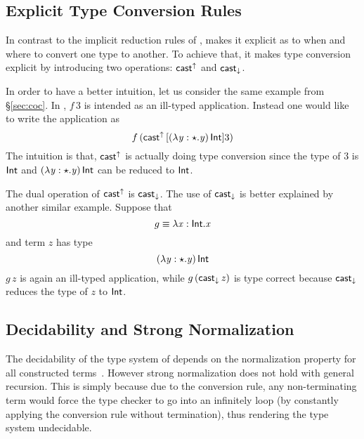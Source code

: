 \subsection{Explicit Type Conversion Rules}


In contrast to the implicit reduction rules of \coc, \name makes it explicit as to when and where to convert one type to another. To achieve that, it makes type conversion explicit by introducing two operations: $ \mathsf{cast}^{\uparrow} $ and $ \mathsf{cast}_{\downarrow} $.

In order to have a better intuition, let us consider the same example from \S\ref{sec:coc}. In \name, $f\,3$ is intended as an ill-typed application. Instead one would like to write the application as \[ f\,(\mathsf{cast}^{\uparrow} \, [  (  \lambda  \mathit{y}  :  \star  .  \mathit{y}  ) \, \mathsf{Int}  ]  3) \] The intuition is that, $ \mathsf{cast}^{\uparrow} $ is actually doing type conversion since the type of $ 3 $ is $  \mathsf{Int}  $ and $ (  \lambda  \mathit{y}  :  \star  .  \mathit{y}  ) \, \mathsf{Int} $ can be reduced to $  \mathsf{Int}  $.

The dual operation of $ \mathsf{cast}^{\uparrow} $ is $ \mathsf{cast}_{\downarrow} $. The use of $ \mathsf{cast}_{\downarrow} $ is better explained by another similar example. Suppose that \[ g \equiv \lambda  \mathit{x}  :  \mathsf{Int}  .  \mathit{x} \] and term $z$ has type \[ (  \lambda  \mathit{y}  :  \star  .  \mathit{y}  ) \, \mathsf{Int} \] $ g\,z $ is again an ill-typed application, while $ g\,(\mathsf{cast}_{\downarrow} \, \mathit{z}) $ is type correct because $ \mathsf{cast}_{\downarrow} $ reduces the type of $ z $ to $  \mathsf{Int}  $.

\subsection{Decidability and Strong Normalization}


The decidability of the type system of \coc depends on the normalization property for all constructed terms~\cite{coc:decidability}. However strong normalization does not hold with general recursion. This is simply because due to the conversion rule, any non-terminating term would force the type checker to go into an infinitely loop (by constantly applying the conversion rule without termination), thus rendering the type system undecidable.

